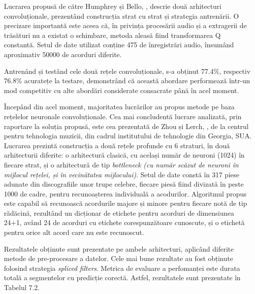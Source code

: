 \documentclass[a4paper,12pt]{report}
\begin{document}
Lucrarea propusă de către Humphrey și Bello, \cite{Rethinking-Automatic-Chord-Recognition-with-CNN}, 
descrie două arhitecturi convoluționale, prezentând construcția strat cu strat și 
strategia antrenării. O precizare importantă este aceea că, în privința procesării audio și 
a extragerii de trăsături nu a existat o schimbare, metoda aleasă fiind transformarea Q constantă. 
Setul de date utilizat conține 475 de înregistrări audio, 
însumând aproximativ 50000 de acorduri diferite.

Antrenând și testând cele două rețele convoluționale, s-a obținut 77.4\%, respectiv 
76.8\% acuratețe la testare, demonstrând că această abordare performează într-un mod competitiv 
cu alte abordări considerate consacrate până în acel moment.

Începând din acel moment, majoritatea lucrărilor au propus metode pe baza 
rețelelor neuronale convoluționale. Cea mai concludentă lucrare analizată, prin raportare 
la soluția propusă, este cea prezentată de Zhou și Lerch, \cite{Chord-detection-using-Deep-Learning},
de la centrul pentru tehnologia muzicii, din cadrul institutului de tehnologie din Georgia, SUA.
Lucrarea prezintă construcția a două rețele profunde cu 6 straturi, în două arhitecturii diferite:
o arhitectură clasică, cu același număr de neuroni (1024) în fiecare strat, și o arhitectură de tip 
\emph{bottleneck (cu număr scăzut de neuroni în mijlocul rețelei, și în vecinătatea mijlocului)}. 
Setul de date constă în 317 piese adunate din discografiile unor trupe celebre, fiecare piesă
fiind divizată în peste 1000 de cadre, pentru recunoașterea individuală a acodurilor. 
Algoritmul propus este capabil să recunoască acordurile majore și minore pentru fiecare 
notă de tip rădăcină, rezultând un dicționar de etichete pentru acorduri de dimensiunea 24+1, având
24 de acorduri cu etichete corespunzătoare cunoscute, și o etichetă pentru orice alt acord care 
nu este recunoscut.

Rezultatele obținute sunt prezentate pe ambele arhitecturi, aplicând diferite metode 
de pre-procesare a datelor. Cele mai bune rezultate au fost obținute folosind strategia 
\emph{spliced filters}. Metrica de evaluare a perfomanței este durata totală a segmentelor cu predicție corectă. 
Astfel, rezultatele sunt prezentate în Tabelul 7.2.

\end{document}
